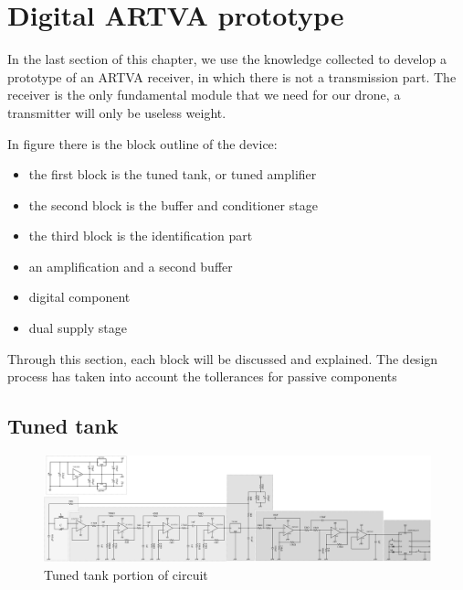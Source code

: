 \section{Digital ARTVA prototype}

In the last section of this chapter, we use the knowledge collected to develop a prototype of an ARTVA receiver, in which there is not a transmission part. The receiver is the only fundamental module that we need for our drone, a transmitter will only be useless weight. 

In figure  there is the block outline of the device:
\begin{itemize}
\item the first block is the tuned tank, or tuned amplifier
\item the second block is the buffer and conditioner stage
\item the third block is the identification part
\item an amplification and a second buffer
\item digital component
\item dual supply stage
\end{itemize}
Through this section, each block will be discussed and explained. The design process has taken into account the tollerances for passive components

\subsection{Tuned tank}
\begin{figure}
	\centering
	\includegraphics*[viewport=3 3 240 457,scale=0.4]{ch2/img/receiver3.pdf}
	\caption{Tuned tank portion of circuit}
	\label{fig:tunedtank}
\end{figure}

